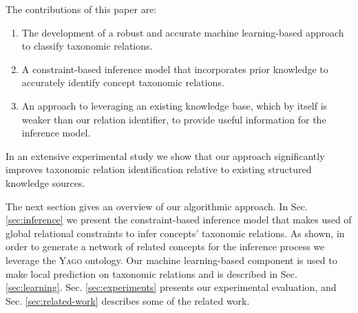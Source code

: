 
%

The contributions of this paper are:

\begin{enumerate}
\item The development of a robust and accurate machine learning-based
  approach to classify taxonomic relations. 
\item A constraint-based inference model that incorporates prior
  knowledge to accurately identify concept taxonomic relations.
\item An approach to leveraging an existing knowledge base, which by
  itself is weaker than our relation identifier, to provide useful information for the inference model.
\end{enumerate}

In an extensive experimental study we show that our approach significantly improves taxonomic relation identification relative to existing structured knowledge sources.

The next section gives an overview of our algorithmic approach. In
Sec. \ref{sec:inference} we present the constraint-based inference
model that makes used of global relational constraints to infer concepts' taxonomic relations. As shown, in order to generate a network of related concepts for the inference process we leverage the \textsc{Yago} ontology. Our machine learning-based component is used to make local prediction on taxonomic
relations  and is described in Sec. \ref{sec:learning}. Sec. \ref{sec:experiments} presents our experimental evaluation, and Sec. \ref{sec:related-work} describes some of the related work. 

